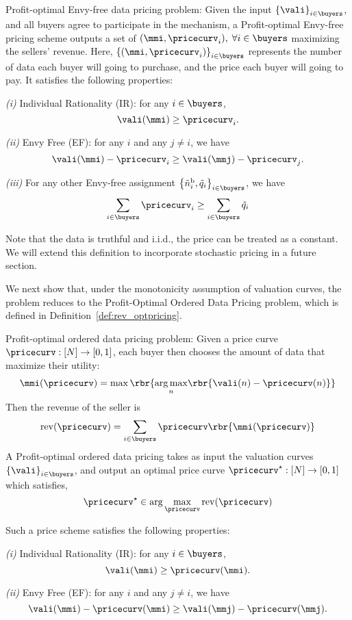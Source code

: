 \begin{definition} \label{def:EF_pricing}
    Profit-optimal Envy-free data pricing problem: Given the input $\left\{ \vali \right\}_{i \in \buyers} $, and all buyers agree to participate in the mechanism, a Profit-optimal Envy-free pricing scheme outputs a set of $(\mmi,\pricecurv_i), \; \forall i \in \buyers$ maximizing the sellers' revenue. Here,  $\left\{(\mmi,\pricecurv_i)\right\}_{i \in \buyers}$ represents the number of data each buyer  will going to purchase, and the price each buyer will going to pay. It satisfies the following properties:

    \emph{(i)} Individual Rationality (IR): for any $i \in \buyers$, \[ \vali(\mmi)\geq \pricecurv_i .\] 

    \emph{(ii)} Envy Free (EF): for any $i$ and any $j \neq i$, we have 
    \[ \vali(\mmi) - \pricecurv_i  \geq   \vali(\mmj) - \pricecurv_j. \]
    
   \emph{(iii)} For any other Envy-free assignment $\left\{ \tilde{n}_i^{\rm b}, \tilde{q}_i\right\}_{i \in \buyers}$, we have 
   \[ \sum_{i \in \buyers} \pricecurv_i \geq \sum_{i \in \buyers} \tilde{q}_i \]
\end{definition}

Note that the data is truthful and i.i.d., the price can be treated as a constant. We will extend this definition to incorporate stochastic pricing in a future section.

We next show that, under the monotonicity assumption of valuation curves, the problem reduces to the Profit-Optimal Ordered Data Pricing problem, which is defined in Definition~\ref{def:rev_optpricing}. 


\begin{definition} \label{def:rev_optpricing}
    Profit-optimal ordered data pricing problem: Given a price curve $\pricecurv: [N] \to [0,1]$, each buyer then chooses the amount of data that maximize their utility:
    \begin{align*}
        \mmi(\pricecurv) = \max \rbr{\underset{n}{\arg\max} \rbr{\vali(n)-\pricecurv(n) }}
    \end{align*}
    Then the revenue of the seller is 
    \begin{align*}
       \mathrm{rev}(\pricecurv) = \sum_{i \in \buyers} \pricecurv \rbr{ \mmi(\pricecurv) }
    \end{align*}
    A Profit-optimal ordered data pricing takes as input the valuation curves $\left\{ \vali \right\}_{i \in \buyers} $, and output an optimal price curve $\pricecurv^{\star}: [N] \to [0,1]$ which satisfies,
    \[\pricecurv^{\star} \in \arg\max_\pricecurv \mathrm{rev}(\pricecurv)  \]

    
    Such a price scheme satisfies the following properties:

    \emph{(i)} Individual Rationality (IR): for any $i \in \buyers$, \[ \vali(\mmi)\geq \pricecurv(\mmi) .\] 

    \emph{(ii)} Envy Free (EF): for any $i$ and any $j \neq i$, we have 
    \[ \vali(\mmi) -\pricecurv(\mmi) \geq   \vali(\mmj) -\pricecurv(\mmj). \]


\end{definition}

